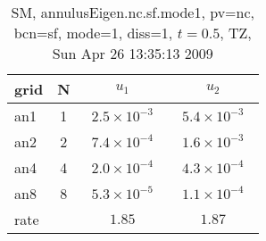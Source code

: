 \begin{table}[hbt]\tableFont %
\begin{center}
\begin{tabular}{|l|c|c|c|} \hline\hline 
grid  & N &  $u_1$ & $u_2$  \\ \hline 
                 an1 &     1 & ~$2.5\times10^{ -3}$~ & ~$5.4\times10^{ -3}$~  \\ \hline
                 an2 &     2 & ~$7.4\times10^{ -4}$~ & ~$1.6\times10^{ -3}$~  \\ \hline
                 an4 &     4 & ~$2.0\times10^{ -4}$~ & ~$4.3\times10^{ -4}$~  \\ \hline
                 an8 &     8 & ~$5.3\times10^{ -5}$~ & ~$1.1\times10^{ -4}$~  \\ \hline
    rate             &       &       $1.85$          &       $1.87$           \\ \hline\hline
\end{tabular}
\caption{SM, annulusEigen.nc.sf.mode1, pv=nc, bcn=sf, mode=1,  diss=1, $t=0.5$,  TZ, Sun Apr 26 13:35:13 2009}\label{table:annulusEigen.nc.sf.mode1}
\end{center}
\end{table}
